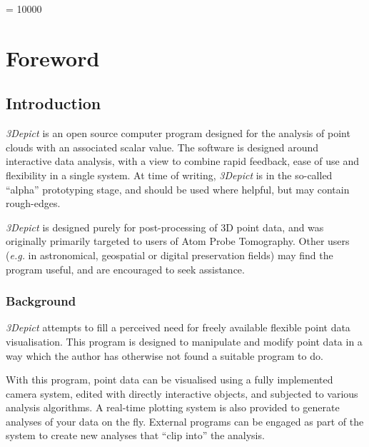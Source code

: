 \documentclass[10pt]{article}
\begin{document}
\widowpenalty = 10000



\section{Foreword}
\subsection{Introduction}

\emph{3Depict} is an open source computer program designed for the analysis of point clouds with an associated scalar value. The software is designed around interactive data analysis, with a view to combine rapid feedback, ease of use and flexibility in a single system.  At time of writing, \emph{3Depict} is in the so-called ``alpha'' prototyping stage, and should be used where helpful, but may contain rough-edges.

\emph{3Depict} is designed purely for post-processing of 3D point data, and was originally primarily targeted to users of Atom Probe Tomography. Other users (\emph{e.g.} in astronomical, geospatial or digital preservation fields) may find the program useful, and are encouraged to seek assistance. 
 
\subsubsection{Background}

\emph{3Depict} attempts to fill a perceived need for freely available flexible point data visualisation. This program is designed to manipulate and modify point data in a way which the author has otherwise not found a suitable program to do.  
 
With this program, point data can be visualised using a fully implemented camera system, edited with directly interactive objects, and subjected to various analysis algorithms. A real-time plotting system is also provided to generate analyses of your data on the fly. External programs can be engaged as part of the system to create new analyses that ``clip into'' the analysis. 
 
\end{document}

